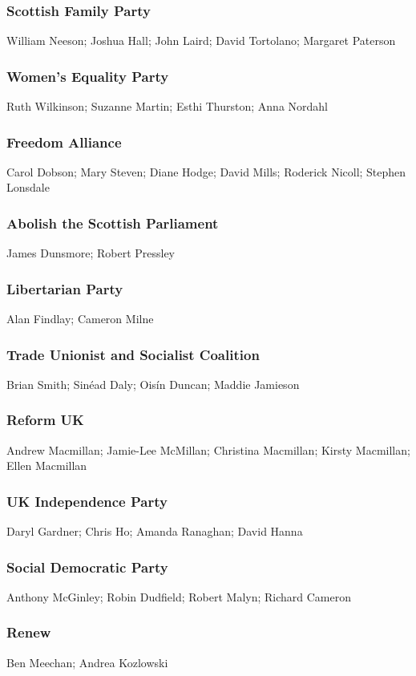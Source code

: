 \begin{resultsiii}
	\subsubsection*{Scottish Family Party}
	William Neeson; Joshua Hall; John Laird; David Tortolano; Margaret Paterson
	
	\subsubsection*{Women's Equality Party}
	Ruth Wilkinson; Suzanne Martin; Esthi Thurston; Anna Nordahl
	
	\subsubsection*{Freedom Alliance}
	Carol Dobson; Mary Steven; Diane Hodge; David Mills; Roderick Nicoll; Stephen Lonsdale
	
	\subsubsection*{Abolish the Scottish Parliament}
	James Dunsmore; Robert Pressley
	
	\subsubsection*{Libertarian Party}
	Alan Findlay; Cameron Milne
	
	\subsubsection*{Trade Unionist and Socialist Coalition}
	Brian Smith; Sinéad Daly; Oisín Duncan; Maddie Jamieson
	
	\subsubsection*{Reform UK}
	Andrew Macmillan; Jamie-Lee McMillan; Christina Macmillan; Kirsty Macmillan; Ellen Macmillan
	
	\subsubsection*{UK Independence Party}
	Daryl Gardner; Chris Ho; Amanda Ranaghan; David Hanna
	
	\subsubsection*{Social Democratic Party}
	Anthony McGinley; Robin Dudfield; Robert Malyn; Richard Cameron
	
	\subsubsection*{Renew}
	Ben Meechan; Andrea Kozlowski
\end{resultsiii}

